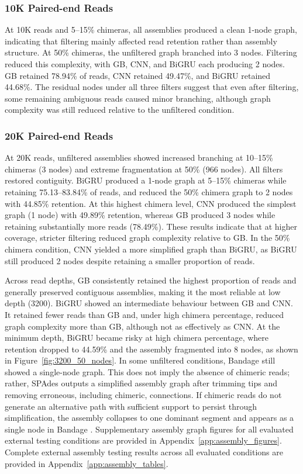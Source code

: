 \subsubsection{10K Paired-end Reads}

At 10K reads and 5--15\% chimeras, all assemblies produced a clean 1-node graph, indicating that filtering mainly affected read retention rather than assembly structure. At 50\% chimeras, the unfiltered graph branched into 3 nodes. Filtering reduced this complexity, with GB, CNN, and BiGRU each producing 2 nodes. GB retained 78.94\% of reads, CNN retained 49.47\%, and BiGRU retained 44.68\%. The residual nodes under all three filters suggest that even after filtering, some remaining ambiguous reads caused minor branching, although graph complexity was still reduced relative to the unfiltered condition.

\subsubsection{20K Paired-end Reads}

At 20K reads, unfiltered assemblies showed increased branching at 10--15\% chimeras (3 nodes) and extreme fragmentation at 50\% (966 nodes). All filters restored contiguity. BiGRU produced a 1-node graph at 5--15\% chimeras while retaining 75.13--83.84\% of reads, and reduced the 50\% chimera graph to 2 nodes with 44.85\% retention. At this highest chimera level, CNN produced the simplest graph (1 node) with 49.89\% retention, whereas GB produced 3 nodes while retaining substantially more reads (78.49\%). These results indicate that at higher coverage, stricter filtering reduced graph complexity relative to GB. In the 50\% chimera condition, CNN yielded a more simplified graph than BiGRU, as BiGRU still produced 2 nodes despite retaining a smaller proportion of reads.

Across read depths, GB consistently retained the highest proportion of reads and generally preserved contiguous assemblies, making it the most reliable at low depth (3200). BiGRU showed an intermediate behaviour between GB and CNN. It retained fewer reads than GB and, under high chimera percentage, reduced graph complexity more than GB, although not as effectively as CNN. At the minimum depth, BiGRU became risky at high chimera percentage, where retention dropped to 44.59\% and the assembly fragmented into 8 nodes, as shown in Figure~\ref{fig:3200_50_nodes}. In some unfiltered conditions, Bandage still showed a single-node graph. This does not imply the absence of chimeric reads; rather, SPAdes outputs a simplified assembly graph after trimming tips and removing erroneous, including chimeric, connections. If chimeric reads do not generate an alternative path with sufficient support to persist through simplification, the assembly collapses to one dominant segment and appears as a single node in Bandage \citep{Bankevich2012,Antipov2016SPAdesHybrid,Wick2015Bandage}. Supplementary assembly graph figures for all evaluated external testing conditions are provided in Appendix~\ref{app:assembly_figures}. Complete external assembly testing results across all evaluated conditions are provided in Appendix~\ref{app:assembly_tables}.


